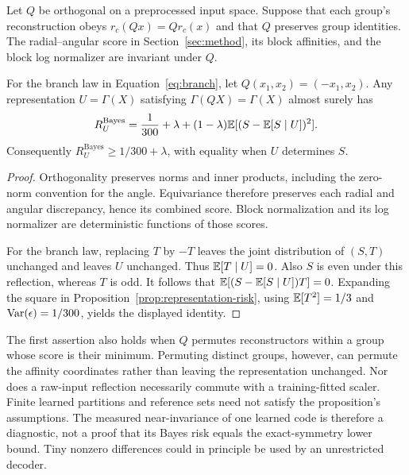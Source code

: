 \begin{proposition}
\label{prop:exact-symmetry}
Let $Q$ be orthogonal on a preprocessed input space. Suppose that each
group's reconstruction obeys $r_c(Qx)=Qr_c(x)$ and that $Q$ preserves
group identities. The radial--angular score in Section~\ref{sec:method},
its block affinities, and the block log normalizer are invariant under $Q$.

For the branch law in Equation~\eqref{eq:branch}, let
$Q(x_1,x_2)=(-x_1,x_2)$. Any representation $U=\Gamma(X)$ satisfying
$\Gamma(QX)=\Gamma(X)$ almost surely has
\[
 R_U^{\mathrm{Bayes}}
 =\frac{1}{300}+\lambda
  +(1-\lambda)\mathbb{E}[(S-\mathbb{E}[S\mid U])^2].
\]
Consequently $R_U^{\mathrm{Bayes}}\geq 1/300+\lambda$, with equality
when $U$ determines $S$.
\end{proposition}
\begin{proof}
Orthogonality preserves norms and inner products, including the zero-norm
convention for the angle. Equivariance therefore preserves each radial
and angular discrepancy, hence its combined score. Block normalization
and its log normalizer are deterministic functions of those scores.

For the branch law, replacing $T$ by $-T$ leaves the joint distribution
of $(S,T)$ unchanged and leaves $U$ unchanged. Thus $\mathbb{E}[T\mid U]=0$.
Also $S$ is even under this reflection, whereas $T$ is odd. It follows
that $\mathbb{E}[(S-\mathbb{E}[S\mid U])T]=0$. Expanding the square in
Proposition~\ref{prop:representation-risk}, using
$\mathbb{E}[T^2]=1/3$ and $\operatorname{Var}(\epsilon)=1/300$, yields the displayed identity.
\end{proof}

The first assertion also holds when $Q$ permutes reconstructors within a
group whose score is their minimum. Permuting distinct groups, however,
can permute the affinity coordinates rather than leaving the representation
unchanged. Nor does a raw-input reflection necessarily commute with a
training-fitted scaler. Finite learned partitions and reference sets need
not satisfy the proposition's assumptions. The measured near-invariance
of one learned code is therefore a diagnostic, not a proof that its
Bayes risk equals the exact-symmetry lower bound. Tiny nonzero differences
could in principle be used by an unrestricted decoder.

